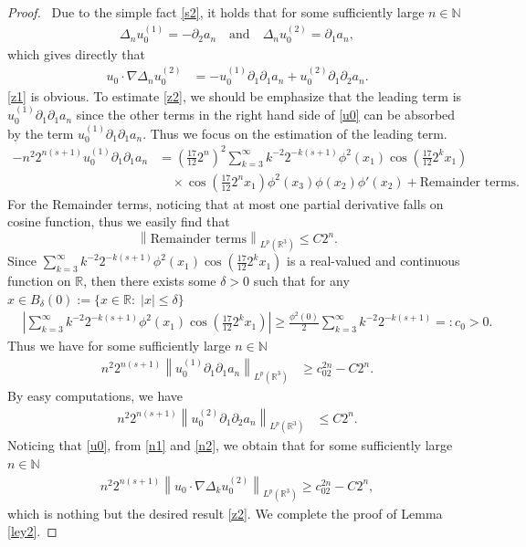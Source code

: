 \documentclass[12pt]{article}
\newcommand{\pa}{\partial}
\newcommand{\fr}{\frac}
\newcommand{\na}{\nabla}
\newcommand{\De}{\Delta}
\newcommand{\cd}{\cdot}
\newcommand{\R}{\mathbb{R}}
\newcommand{\f}{\left}
\newcommand{\g}{\right}
\begin{document}
\begin{proof}\,
Due to the simple fact \eqref{s2}, it holds that for some sufficiently large $n\in \mathbb{N}$
 \begin{align*}
 \Delta_{n}u_0^{(1)}=-\pa_2a_n\quad\text{and}\quad\Delta_{n}u_0^{(2)}=\pa_1a_n,
    \end{align*}
 which gives directly that
    \begin{align}\label{u0}
u_0\cd\na \De_{n}u_0^{(2)}&=
-u_0^{(1)}{\pa_1\pa_1}a_n+u_0^{(2)}\pa_1\pa_2a_n.
    \end{align}
\eqref{z1} is obvious.
To estimate \eqref{z2}, we should be emphasize that the leading term is $u_0^{(1)}{\pa_1\pa_1}a_n$ since the other terms in the right hand side of \eqref{u0} can be absorbed by the term $u_0^{(1)}{\pa_1\pa_1}a_n$. Thus we focus on the estimation of the leading term.
\begin{align*}
-n^{2}2^{n(s+1)}u_0^{(1)}{\pa_1\pa_1}a_n&=\f(\fr{17}{12}2^{n}\g)^2\sum_{k=3}^{\infty}k^{-2}2^{-k(s+1)}\phi^2(x_1)\cos \left(\frac{17}{12}2^kx_1\right)\\
&\quad\times \cos \left(\frac{17}{12}2^nx_1\right)\phi^2(x_3)\phi(x_2)\phi'(x_2)
+\text{Remainder terms}.
\end{align*}
For the Remainder terms, noticing that at most one partial derivative falls on cosine function, thus we easily find that
$$\f\|\text{Remainder terms}\g\|_{L^p(\R^3)}\leq C2^{n}.$$
Since $\sum_{k=3}^{\infty}k^{-2}2^{-k(s+1)}\phi^2(x_1)\cos \left(\frac{17}{12}2^kx_1\right)$ is a real-valued and continuous function on $\R$, then there exists some $\delta>0$ such that for any $x\in B_{\delta}(0):=\{x\in\mathbb{R}:\;|x|\leq\delta\}$
\begin{align*}
&\f|\sum_{k=3}^{\infty}k^{-2}2^{-k(s+1)}\phi^2(x_1)\cos \left(\frac{17}{12}2^kx_1\right)\g|
\geq\fr{\phi^2(0)}{2}\sum\limits^{\infty}_{k=3}k^{-2}2^{-k(s+1)}=:c_0>0.
\end{align*}
Thus we have for some sufficiently large $n\in \mathbb{N}$
\begin{align}\label{n1}
n^{2}2^{n(s+1)}\f\|u_0^{(1)}\pa_1\pa_1a_n\g\|_{L^p(\R^3)}&\geq c_02^{2n}-C2^n.
   \end{align}
By easy computations, we have
\begin{align}\label{n2}
n^{2}2^{n(s+1)}\f\|u_0^{(2)}\pa_1\pa_2a_n\g\|_{L^p(\R^3)}&\leq C2^{n}.
   \end{align}
Noticing that \eqref{u0}, from \eqref{n1} and \eqref{n2}, we obtain that for some sufficiently large $n\in \mathbb{N}$
\begin{align*}
n^{2}2^{n(s+1)}\f\|u_0\cd\na \De_{k}u_0^{(2)}\g\|_{L^p(\R^3)}\geq c_02^{2n}-C2^n,
   \end{align*}
which is nothing but the desired result \eqref{z2}. We complete the proof of Lemma \ref{ley2}.
\end{proof}
\end{document}
